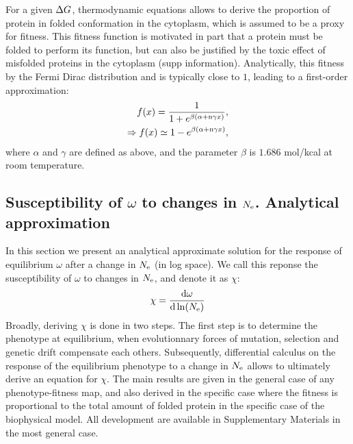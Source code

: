 \documentclass{article}
\begin{document}
	For a given $\Delta G$, thermodynamic equations allows to derive the proportion of protein in folded conformation in the cytoplasm, which is assumed to be a proxy for fitness.
	This fitness function is motivated in part that a protein must be folded to perform its function, but can also be justified by the toxic effect of misfolded proteins in the cytoplasm (supp information).
	Analytically, this fitness by the Fermi Dirac distribution and is typically close to $1$, leading to a first-order approximation\cite{Goldstein2011}: 
	\begin{align}
		f(x) = \dfrac{1}{1 + e^{\beta (\alpha + \text{n} \gamma x)}},\\
		\Rightarrow f(x) \simeq 1 - e^{\beta (\alpha + \text{n} \gamma x)}, 
	\end{align}
	where $\alpha$ and $\gamma$ are defined as above, and the parameter $\beta$ is $1.686$ mol/kcal at room temperature.
	
	\subsection*{Susceptibility of $\omega$ to changes in $N_{\mathrm{e}}$. Analytical approximation}
	
	In this section we present an analytical approximate solution for the response of equilibrium $\omega$ after a change in $N_{\mathrm{e}}$ (in log space). We call this reponse the susceptibility of $\omega$ to changes in $N_{\mathrm{e}}$, and denote it as $\chi$:
	\begin{align}
		\chi = \frac{ \mathrm{d} \omega}{\mathrm{d} \ln (N_{\mathrm{e}})}
	\end{align}
	Broadly, deriving $\chi$ is done in two steps.
	The first step is to determine the phenotype at equilibrium, when evolutionnary forces of mutation, selection and genetic drift compensate each others.
	Subsequently, differential calculus on the response of the equilibrium phenotype to a change in $N_{\mathrm{e}}$ allows to ultimately derive an equation for $\chi$.
	The main results are given in the general case of any phenotype-fitness map, and also derived in the specific case where the fitness is proportional to the total amount of folded protein in the specific case of the biophysical model.
	All development are available in Supplementary Materials in the most general case.
	
\end{document}
